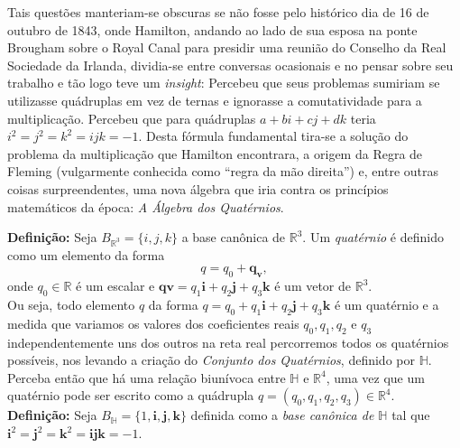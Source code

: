 \documentclass[a4paper,12pt]{report}
\theoremstyle{plain}
\theoremstyle{definition}
\begin{document}
	Tais questões manteriam-se obscuras se não fosse pelo histórico dia de 16 de outubro de 1843, onde Hamilton, andando ao lado de sua esposa na ponte Brougham sobre o Royal Canal para presidir uma reunião do Conselho da Real Sociedade da Irlanda, dividia-se entre conversas ocasionais e no pensar sobre seu trabalho e tão logo teve um \textit{insight}: Percebeu que seus problemas sumiriam se utilizasse quádruplas em vez de ternas e ignorasse a comutatividade para a multiplicação. Percebeu que para quádruplas $a + bi + cj + dk$ teria $i^2 = j^2 = k^2 = ijk = -1$. Desta fórmula fundamental tira-se a solução do problema da multiplicação que Hamilton encontrara, a origem da Regra de Fleming (vulgarmente conhecida como “regra da mão direita”) e, entre outras coisas surpreendentes, uma nova álgebra que iria contra os princípios matemáticos da época: \textit{A Álgebra dos Quatérnios}.
	
	\textbf{Definição: }Seja $B_{\mathbb{R}^3}=\{i,j,k\}$ a base canônica de $\mathbb{R}^3$. Um \textit{quatérnio} é definido como um elemento da forma 
	\begin{equation}
		q=q_0+\mathbf{q_v},
	\end{equation} 
	onde $q_0 \in \mathbb{R}$ é um escalar e $\mathbf{qv}=q_1\mathbf{i}+q_2\mathbf{j}+q_3\mathbf{k}$ é um vetor de $\mathbb{R}^3$.
	\\
	
	Ou seja, todo elemento $q$ da forma $q = q_0 + q_1\textbf{i} + q_2\textbf{j} + q_3\textbf{k}$ é um quatérnio e a medida que variamos os valores dos coeficientes reais $q_0, q_1, q_2$ e $q_3$ independentemente uns dos outros na reta real percorremos todos os quatérnios possíveis, nos levando a criação do \textit{Conjunto dos Quatérnios}, definido por $\mathbb{H}$. Perceba então que há uma relação biunívoca entre $\mathbb{H}$ e $\mathbb{R}^4$, uma vez que um quatérnio pode ser escrito como a quádrupla $q = (q_0, q_1, q_2, q_3) \in \mathbb{R}^4$. \cite{fidalgotese}
	\\
	
	\textbf{Definição:} Seja $B_\mathbb{H} = \{1, \mathbf{i}, \mathbf{j}, \mathbf{k}\}$ definida como a \textit{base canônica de $\mathbb{H}$} tal que $\mathbf{i}^2 = \mathbf{j}^2 = \mathbf{k}^2 = \mathbf{ijk} = -1$.
	\\
	
\end{document}

